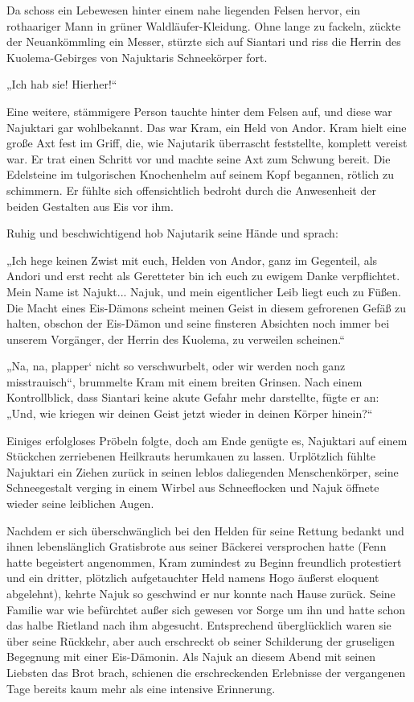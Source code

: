\documentclass[10pt, a4paper, oneside]{book}
\begin{document}
Da schoss ein Lebewesen hinter einem nahe liegenden Felsen hervor, ein rothaariger Mann in grüner Waldläufer-Kleidung. Ohne lange zu fackeln, zückte der Neuankömmling ein Messer, stürzte sich auf Siantari und riss die Herrin des Kuolema-Gebirges von Najuktaris Schneekörper fort.

„Ich hab sie! Hierher!“

Eine weitere, stämmigere Person tauchte hinter dem Felsen auf, und diese war Najuktari gar wohlbekannt. Das war Kram, ein Held von Andor. Kram hielt eine große Axt fest im Griff, die, wie Najutarik überrascht feststellte, komplett vereist war. Er trat einen Schritt vor und machte seine Axt zum Schwung bereit. Die Edelsteine im tulgorischen Knochenhelm auf seinem Kopf begannen, rötlich zu schimmern. Er fühlte sich offensichtlich bedroht durch die Anwesenheit der beiden Gestalten aus Eis vor ihm.

Ruhig und beschwichtigend hob Najutarik seine Hände und sprach: 

„Ich hege keinen Zwist mit euch, Helden von Andor, ganz im Gegenteil, als Andori und erst recht als Geretteter bin ich euch zu ewigem Danke verpflichtet. Mein Name ist Najukt... Najuk, und mein eigentlicher Leib liegt euch zu Füßen. Die Macht eines Eis-Dämons scheint meinen Geist in diesem gefrorenen Gefäß zu halten, obschon der Eis-Dämon und seine finsteren Absichten noch immer bei unserem Vorgänger, der Herrin des Kuolema, zu verweilen scheinen.“

„Na, na, plapper‘ nicht so verschwurbelt, oder wir werden noch ganz misstrauisch“, brummelte Kram mit einem breiten Grinsen. Nach einem Kontrollblick, dass Siantari keine akute Gefahr mehr darstellte, fügte er an: „Und, wie kriegen wir deinen Geist jetzt wieder in deinen Körper hinein?“

Einiges erfolgloses Pröbeln folgte, doch am Ende genügte es, Najuktari auf einem Stückchen zerriebenen Heilkrauts herumkauen zu lassen. Urplötzlich fühlte Najuktari ein Ziehen zurück in seinen leblos daliegenden Menschenkörper, seine Schneegestalt verging in einem Wirbel aus Schneeflocken und Najuk öffnete wieder seine leiblichen Augen. 

Nachdem er sich überschwänglich bei den Helden für seine Rettung bedankt und ihnen lebenslänglich Gratisbrote aus seiner Bäckerei versprochen hatte (Fenn hatte begeistert angenommen, Kram zumindest zu Beginn freundlich protestiert und ein dritter, plötzlich aufgetauchter Held namens Hogo äußerst eloquent abgelehnt), kehrte Najuk so geschwind er nur konnte nach Hause zurück. Seine Familie war wie befürchtet außer sich gewesen vor Sorge um ihn und hatte schon das halbe Rietland nach ihm abgesucht. Entsprechend überglücklich waren sie über seine Rückkehr, aber auch erschreckt ob seiner Schilderung der gruseligen Begegnung mit einer Eis-Dämonin. Als Najuk an diesem Abend mit seinen Liebsten das Brot brach, schienen die erschreckenden Erlebnisse der vergangenen Tage bereits kaum mehr als eine intensive Erinnerung. 
\end{document}
